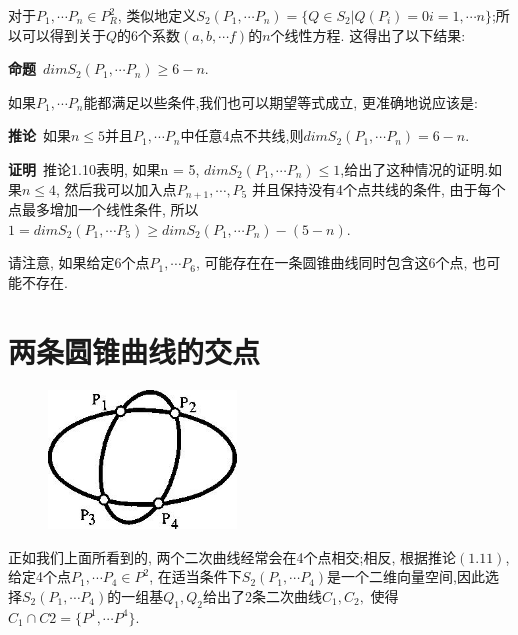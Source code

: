 \documentclass[UTF8]{book}
\begin{document}
		
		对于$P_{1},\cdots P_{n}\in P^{2}_{R}$, 类似地定义$S_{2}(P_{1},\cdots P_{n})=\{Q\in S_{2}|Q(P_{i})=0  i=1,\cdots n\}$;所以可以得到关于$ Q $的6个系数$(a,b,\cdots f)$的$ n $个线性方程. 这得出了以下结果:
		
		
		\textbf{命题}\ $dimS_{2}(P_{1},\cdots P_{n})\geq6-n$.
		
		
		如果$P_{1},\cdots P_{n}$能都满足以些条件,我们也可以期望等式成立, 更准确地说应该是:
		
		
		\textbf{推论}\ 如果$n\leq5$并且$P_{1},\cdots P_{n}$中任意4点不共线,则$dimS_{2}(P_{1},\cdots P_{n})=6-n$.
		
		
		\textbf{证明}\ 推论1.10表明, 如果n = 5, $dim S_{2}(P_{1},\cdots P_{n})\leq1$,给出了这种情况的证明.如果$n\leq4$, 然后我可以加入点$P_{n+1},\cdots,P_{5}$ 并且保持没有4个点共线的条件, 由于每个点最多增加一个线性条件, 所以$1=dimS_{2}(P_{1},\cdots P_{5})\geq dimS_{2}(P_{1},\cdots P_{n})-(5-n)$.
		
		
		请注意, 如果给定6个点$P_{1},\cdots P_{6}$, 可能存在在一条圆锥曲线同时包含这6个点, 也可能不存在.
		
	\section{两条圆锥曲线的交点}
		\begin{figure}[H]
		  \centering
		  \includegraphics[width=5cm]{20.jpg}\\
		\end{figure}
		正如我们上面所看到的, 两个二次曲线经常会在4个点相交;相反, 根据推论$ (1.11) $, 给定4个点$P_{1},\cdots P_{4}\in P^{2}$, 在适当条件下$S_{2}(P_{1},\cdots P_{4})$是一个二维向量空间,因此选择$S_{2}(P_{1},\cdots P_{4})$的一组基$Q_{1},Q_{2}$给出了2条二次曲线$C_{1},C_{2},$ 使得$C_{1}\cap C2=\{P^{1},\cdots P^{4}\}$.
		
\end{document}
